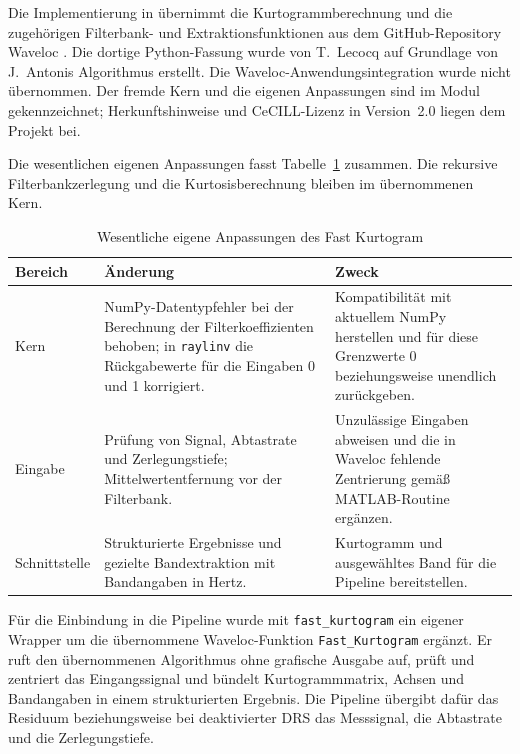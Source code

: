 \label{subsec:fast_kurtogram_impl}

\begingroup
\setlength{\emergencystretch}{2em}

Die Implementierung in  übernimmt die
Kurtogrammberechnung und die zugehörigen Filterbank- und
Extraktionsfunktionen aus dem GitHub-Repository Waveloc
\cite{lecocqFastKurtogram2012}. Die dortige Python-Fassung wurde von
T.~Lecocq auf Grundlage von J.~Antonis Algorithmus erstellt.
Die Waveloc-Anwendungsintegration wurde nicht übernommen. Der fremde Kern
und die eigenen Anpassungen sind im Modul gekennzeichnet; Herkunftshinweise
und CeCILL-Lizenz in Version~2.0 liegen dem Projekt bei.

Die wesentlichen eigenen Anpassungen fasst
Tabelle~\ref{tab:fast_kurtogram_anpassungen_impl} zusammen. Die rekursive
Filterbankzerlegung und die Kurtosisberechnung bleiben im übernommenen Kern.

\begin{table}[htbp]
  \centering
  \small
  \caption{Wesentliche eigene Anpassungen des Fast Kurtogram}
  \label{tab:fast_kurtogram_anpassungen_impl}
  \begin{tabularx}{\textwidth}{|
      >{\raggedright\arraybackslash}p{2.1cm}|
      >{\raggedright\arraybackslash}X|
      >{\raggedright\arraybackslash}X|}
    \hline
    \textbf{Bereich} & \textbf{Änderung} & \textbf{Zweck} \\
    \hline
    Kern & NumPy-Datentypfehler bei der Berechnung der Filterkoeffizienten
    behoben; in \texttt{raylinv} die Rückgabewerte für die Eingaben 0 und 1
    korrigiert. &
    Kompatibilität mit aktuellem NumPy herstellen und für diese Grenzwerte
    0 beziehungsweise unendlich zurückgeben. \\
    \hline
    Eingabe & Prüfung von Signal, Abtastrate und Zerlegungstiefe;
    Mittelwertentfernung vor der Filterbank. &
    Unzulässige Eingaben abweisen und die in Waveloc fehlende
    Zentrierung gemäß MATLAB-Routine ergänzen. \\
    \hline
    Schnittstelle & Strukturierte Ergebnisse und gezielte Bandextraktion
    mit Bandangaben in Hertz. &
    Kurtogramm und ausgewähltes Band für die Pipeline bereitstellen. \\
    \hline
  \end{tabularx}
\end{table}

Für die Einbindung in die Pipeline wurde mit \texttt{fast\_kurtogram} ein
eigener Wrapper um die übernommene Waveloc-Funktion
\texttt{Fast\_Kurtogram} ergänzt. Er ruft den übernommenen Algorithmus ohne
grafische Ausgabe auf, prüft und zentriert das Eingangssignal und bündelt
Kurtogrammmatrix, Achsen und Bandangaben in einem strukturierten Ergebnis.
Die Pipeline übergibt dafür das Residuum beziehungsweise bei deaktivierter
DRS das Messsignal, die Abtastrate und die Zerlegungstiefe.

